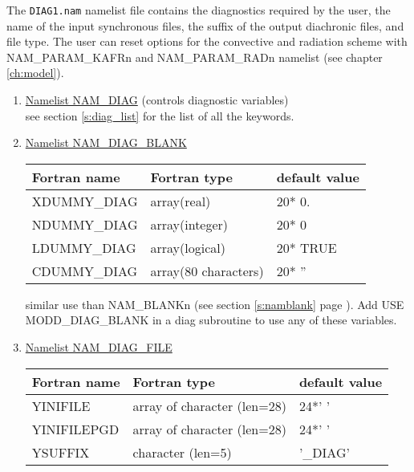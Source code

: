 The {\tt DIAG1.nam} namelist file contains the diagnostics required
by the user, the name of the input synchronous files, the suffix of the
output diachronic files, and file type. The user can reset
options for the convective and radiation scheme with
NAM\_PARAM\_KAFRn and NAM\_PARAM\_RADn namelist  (see chapter
\ref{ch:model}).
\begin{enumerate}
\item\underline{Namelist NAM\_DIAG} (controls diagnostic variables)\\

see section \ref{s:diag_list} for the list of all the keywords.

\item\underline{Namelist NAM\_DIAG\_BLANK}
\begin{center}
\begin{tabular} {|l|l|l|}
\hline
Fortran name & Fortran type & default value \\
\hline
XDUMMY\_DIAG \index{XDUMMY\_DIAG!\innam{NAM\_DIAG\_BLANK}}  & array(real)          & 20* 0.   \\
NDUMMY\_DIAG \index{NDUMMY\_DIAG!\innam{NAM\_DIAG\_BLANK}}  & array(integer)       & 20* 0    \\
LDUMMY\_DIAG \index{LDUMMY\_DIAG!\innam{NAM\_DIAG\_BLANK}}  & array(logical)       & 20* TRUE \\
CDUMMY\_DIAG \index{CDUMMY\_DIAG!\innam{NAM\_DIAG\_BLANK}}  & array(80 characters) & 20* ''   \\
\hline
\end{tabular}
\end{center}
similar use than NAM\_BLANKn (see section \ref{s:namblank} page \pageref{s:namblank}).
Add USE MODD\_DIAG\_BLANK in a diag subroutine to use
any of these variables.

\item\underline{Namelist NAM\_DIAG\_FILE} 
\begin{center}
\begin{tabular} {|l|l|l|}
\hline
Fortran name & Fortran type & default value\\
\hline
\hline
YINIFILE     & array of character (len=28)  & 24*' '   \\
YINIFILEPGD  & array of character (len=28)  & 24*' '   \\
YSUFFIX      & character (len=5)  & '\_DIAG'   \\
\hline
\end{tabular}
\end{center}


\end{enumerate}
